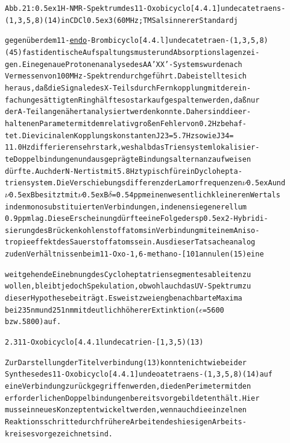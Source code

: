 \documentclass[a4paper,11pt]{article}
\begin{document}
\begin{alltt}
Abb. 21: \raise0.5ex\hbox{1}H-NMR-Spektrum des 11-Oxobicyclo[4.4.1]undecatetraens-
(1,3,5‚8) (14) in CDCl\lower0.5ex\hbox{3} (60 MHz; TMS als innerer Standardj


gegenüber dem 11-\underline{endo}-Brombicyclo[4.4.l]undecatetraen-(1‚3,5,8)
(45) fast identische Aufspaltungsmuster und Absorptionslagen zei-
gen. Eine genaue Protonenanalyse des AA'XX'-Systems wurde nach
Vermessen von 100 MHz - Spektren durchgeführt. Dabei stellte sich
heraus, daß die Signale des X-Teils durch Fernkopplung mit der ein-
fach ungesättigten Ringhälfte so stark aufgespalten werden, daß nur
der A-Teil angenähert analysiert werden konnte. Daher sind die er-
haltenen Parameter mit dem relativ großen Fehler von 0.2 Hz behaf-
tet. Die vicinalen Kopplungskonstanten J23 = 5.7 Hz sowie J34 =
11.0 Hz differieren sehr stark, weshalb das Triensystem lokalisier-
te Doppelbindungen und ausgeprägte Bindungsalternanz aufweisen
dürfte. Auch der N-Nert ist mit 5.8 Hz typisch für ein Dyclohepta-
triensystem. Die Verschiebungsdifferenz der Lamorfrequenzen \(\nu\)\lower0.5ex\hbox{A} und
\(\nu\)\lower0.5ex\hbox{B} besitzt mit \(\nu\)\lower0.5ex\hbox{B} \(\delta\) = 0.54 ppm einen wesentlich kleineren Wert als
in den monosubstituierten Verbindungen, in denen sie generell um
0.9 ppm lag. Diese Erscheinung dürfte eine Folge der sp\raise0.5ex\hbox{2}-Hybridi-
sierung des Brückenkohlenstoffatoms in Verbindung mit einem Aniso-
tropieeffekt des Sauerstoffatoms sein. Aus dieser Tatsache analog
zu den Verhältnissen beim 11-Oxo-1,6-methano-[101annulen (15) eine

\newpage
{}


weitgehende Einebnung des Cycloheptatriensegmentes ableiten zu
wollen, bleibt jedoch Spekulation, obwohl auch das UV-Spektrum zu
dieser Hypothese beiträgt. Es weist zwei eng benachbarte Maxima
bei 235 nm und 251 nm mit deutlich höherer Extinktion (\(\epsilon\) = 5600
bzw. 5800) auf.

 

2.3 11-Oxobicyclo[4.4.1lundecatrien-[1‚3,5) (13)

Zur Darstellung der Titelverbindung (13) konnte nicht wie bei der
Synthese des 11-Oxobicyclo[4.4.1]undeoatetraens-(1‚3,5,8) (14) auf
eine Verbindung zurückgegriffen werden, die den Perimeter mit den
erforderlichen Doppelbindungen bereits vorgebildet enthält. Hier
muss ein neues Konzept entwickelt werden, wenn auch die einzelnen
Reaktionsschritte durch frühere Arbeiten des hiesigen Arbeits-
kreises vorgezeichnet sind.

\end{alltt}
\end{document}

